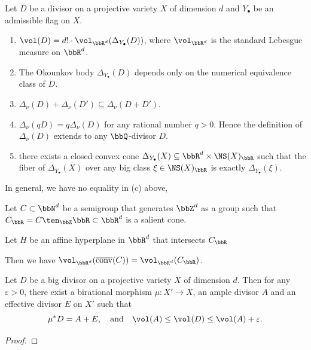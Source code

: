   \begin{theorem}
    Let $D$ be a divisor on a projective variety $X$ of dimension $d$ and $Y_\bullet$ be an admissible flag on $X$.
    \begin{enumerate}
      \item $\vol(D) = d! \cdot \vol_{\bbR^d}(\Delta_{Y_\bullet}(D))$, where $\vol_{\bbR^d}$ is the standard Lebesgue measure on $\bbR^d$.
      \item The Okounkov body $\Delta_{Y_\bullet}(D)$ depends only on the numerical equivalence class of $D$.
      \item $\Delta_\nu(D) + \Delta_\nu(D') \subseteq   \Delta_\nu(D + D')$.
      \item $\Delta_\nu(qD) = q \Delta_\nu(D)$ for any rational number $q > 0$. 
        Hence the definition of $\Delta_\nu(D)$ extends to any $\bbQ$-divisor $D$.
      \item there exists a closed convex cone $\Delta_{Y_\bullet}(X) \subseteq \bbR^d \times \NS(X)_\bbR$ such that the fiber of $\Delta_{Y_\bullet}(X)$ over any big class $\xi \in \NS(X)_\bbR$ is exactly $\Delta_{Y_\bullet}(\xi)$.
    \end{enumerate}
    \Yang{}
  \end{theorem}

  \begin{remark}
    In general, we have no equality in (c) above, \Yang{}
  \end{remark}

  \begin{lemma}
    Let $C \subset \bbN^d$ be a semigroup that generates $\bbZ^d$ as a group such that $C_\bbR = C \ten_\bbZ \bbR \subset \bbR^d$ is a salient cone. 

    Let $H$ be an affine hyperplane in $\bbR^d$ that intersects $C_\bbR$ 


    Then we have $\vol_{\bbR^d}(\overline{\mathrm{conv}}(C)) = \vol_{\bbR^d}(C_\bbR)$.
     \Yang{}
  \end{lemma}


  \begin{theorem}
    Let $D$ be a big divisor on a projective variety $X$ of dimension $d$.
    Then for any $\varepsilon > 0$, there exist a birational morphism $\mu: X' \to X$, an ample divisor $A$ and an effective divisor $E$ on $X'$ such that 
    \[ \mu^* D = A + E, \quad \text{and} \quad \vol(A) \leq \vol(D) \leq \vol(A) + \varepsilon. \]
     \Yang{}
  \end{theorem}
  \begin{proof}
    \Yang{}
  \end{proof}






